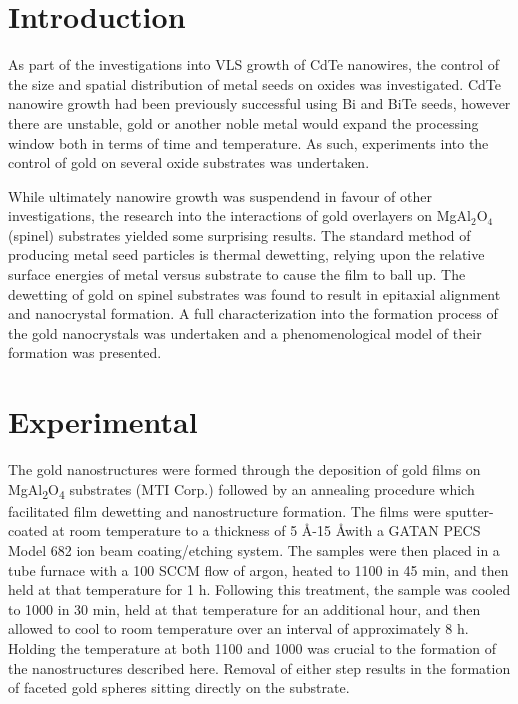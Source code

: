 \section{Introduction}
As part of the investigations into VLS growth of CdTe nanowires, the control of the size and spatial distribution of metal seeds on oxides was investigated. CdTe nanowire growth had been previously successful using Bi and BiTe seeds, however there are unstable, gold or another noble metal would expand the processing window both in terms of time and temperature. As such, experiments into the control of gold on several oxide substrates was undertaken.

While ultimately nanowire growth was suspendend in favour of other investigations, the research into the interactions of gold overlayers on MgAl\(_2\)O\(_4\) (spinel) substrates yielded some surprising results. The standard method of producing metal seed particles is thermal dewetting, relying upon the relative surface energies of metal versus substrate to cause the film to ball up. The dewetting of gold on spinel substrates was found to result in epitaxial alignment and nanocrystal formation. A full characterization into the formation process of the gold nanocrystals was undertaken and a phenomenological model of their formation was presented.

\section{Experimental}
The gold nanostructures were formed through the deposition of gold films on MgAl\textsubscript{2}O\textsubscript{4} substrates (MTI Corp.)
followed by an annealing procedure which facilitated film
dewetting and nanostructure formation. The films were
sputter-coated at room temperature to a thickness of 5 \AA-15
\AA with a GATAN PECS Model 682 ion beam coating/etching system. The samples were then placed in a tube
furnace with a 100 SCCM flow of argon, heated to 1100 \celsius{}
in 45 min, and then held at that temperature for 1 h.
Following this treatment, the sample was cooled to 1000 \celsius{}
in 30 min, held at that temperature for an additional hour,
and then allowed to cool to room temperature over an interval
of approximately 8 h. Holding the temperature at both 1100
and 1000 \celsius{} was crucial to the formation of the nanostructures described here. Removal of either step results in the formation of faceted gold spheres sitting directly on the substrate.

